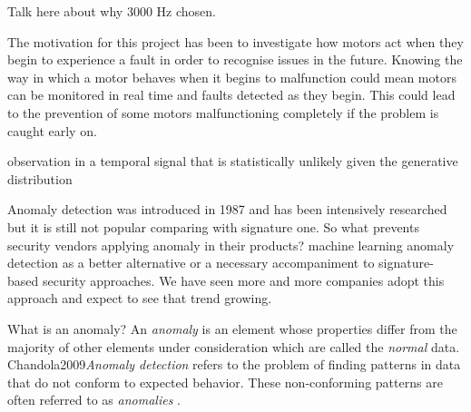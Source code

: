 Talk here about why 3000 Hz chosen.

The motivation for this project has been to investigate how motors act when they begin to experience a fault in order to recognise issues in the future. Knowing the way in which a motor behaves when it begins to malfunction could mean motors can be monitored in real time and faults detected as they begin. This could lead to the prevention of some motors malfunctioning completely if the problem is caught early on.

observation in a temporal signal that is statistically unlikely
given the generative distribution

Anomaly detection was introduced in 1987 and has been intensively researched but it is still not popular comparing with signature one. So what prevents security vendors applying anomaly in their products? machine learning anomaly detection as a better alternative or a necessary accompaniment to signature-based security approaches. We have seen more and more companies adopt this approach and expect to see that trend growing.
























































\iffalse
What is an anomaly? An \emph{anomaly} is an element whose properties differ from the majority of other elements under consideration which are called the \emph{normal} data. {Chandola2009}{\emph{Anomaly detection} refers to the problem of finding patterns in data that do not conform to expected behavior. These non-conforming patterns are often referred to as \emph{anomalies} \textelp{}}.

